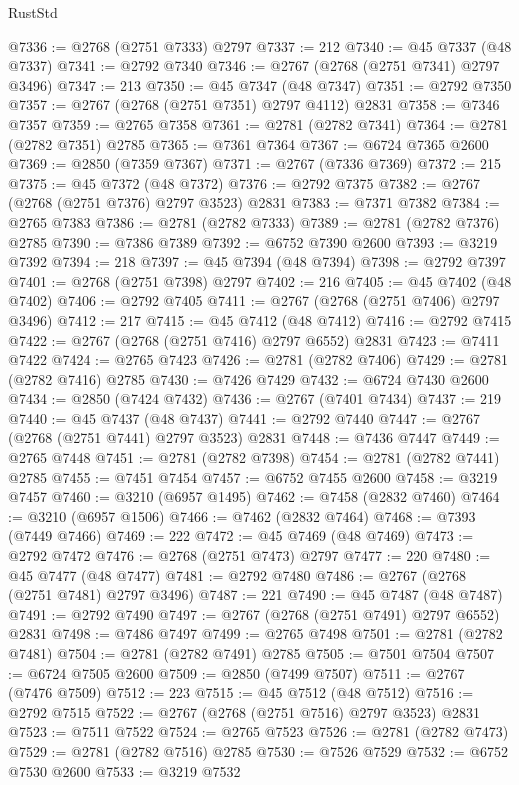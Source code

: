 \begin{lexlean}{RustStd}
\begin{coremodule}
@7336 := @2768 (@2751 @7333) @2797
@7337 := 212
@7340 := @45 @7337 (@48 @7337)
@7341 := @2792 @7340
@7346 := @2767 (@2768 (@2751 @7341) @2797 @3496)
@7347 := 213
@7350 := @45 @7347 (@48 @7347)
@7351 := @2792 @7350
@7357 := @2767 (@2768 (@2751 @7351) @2797 @4112) @2831
@7358 := @7346 @7357
@7359 := @2765 @7358
@7361 := @2781 (@2782 @7341)
@7364 := @2781 (@2782 @7351) @2785
@7365 := @7361 @7364
@7367 := @6724 @7365 @2600
@7369 := @2850 (@7359 @7367)
@7371 := @2767 (@7336 @7369)
@7372 := 215
@7375 := @45 @7372 (@48 @7372)
@7376 := @2792 @7375
@7382 := @2767 (@2768 (@2751 @7376) @2797 @3523) @2831
@7383 := @7371 @7382
@7384 := @2765 @7383
@7386 := @2781 (@2782 @7333)
@7389 := @2781 (@2782 @7376) @2785
@7390 := @7386 @7389
@7392 := @6752 @7390 @2600
@7393 := @3219 @7392
@7394 := 218
@7397 := @45 @7394 (@48 @7394)
@7398 := @2792 @7397
@7401 := @2768 (@2751 @7398) @2797
@7402 := 216
@7405 := @45 @7402 (@48 @7402)
@7406 := @2792 @7405
@7411 := @2767 (@2768 (@2751 @7406) @2797 @3496)
@7412 := 217
@7415 := @45 @7412 (@48 @7412)
@7416 := @2792 @7415
@7422 := @2767 (@2768 (@2751 @7416) @2797 @6552) @2831
@7423 := @7411 @7422
@7424 := @2765 @7423
@7426 := @2781 (@2782 @7406)
@7429 := @2781 (@2782 @7416) @2785
@7430 := @7426 @7429
@7432 := @6724 @7430 @2600
@7434 := @2850 (@7424 @7432)
@7436 := @2767 (@7401 @7434)
@7437 := 219
@7440 := @45 @7437 (@48 @7437)
@7441 := @2792 @7440
@7447 := @2767 (@2768 (@2751 @7441) @2797 @3523) @2831
@7448 := @7436 @7447
@7449 := @2765 @7448
@7451 := @2781 (@2782 @7398)
@7454 := @2781 (@2782 @7441) @2785
@7455 := @7451 @7454
@7457 := @6752 @7455 @2600
@7458 := @3219 @7457
@7460 := @3210 (@6957 @1495)
@7462 := @7458 (@2832 @7460)
@7464 := @3210 (@6957 @1506)
@7466 := @7462 (@2832 @7464)
@7468 := @7393 (@7449 @7466)
@7469 := 222
@7472 := @45 @7469 (@48 @7469)
@7473 := @2792 @7472
@7476 := @2768 (@2751 @7473) @2797
@7477 := 220
@7480 := @45 @7477 (@48 @7477)
@7481 := @2792 @7480
@7486 := @2767 (@2768 (@2751 @7481) @2797 @3496)
@7487 := 221
@7490 := @45 @7487 (@48 @7487)
@7491 := @2792 @7490
@7497 := @2767 (@2768 (@2751 @7491) @2797 @6552) @2831
@7498 := @7486 @7497
@7499 := @2765 @7498
@7501 := @2781 (@2782 @7481)
@7504 := @2781 (@2782 @7491) @2785
@7505 := @7501 @7504
@7507 := @6724 @7505 @2600
@7509 := @2850 (@7499 @7507)
@7511 := @2767 (@7476 @7509)
@7512 := 223
@7515 := @45 @7512 (@48 @7512)
@7516 := @2792 @7515
@7522 := @2767 (@2768 (@2751 @7516) @2797 @3523) @2831
@7523 := @7511 @7522
@7524 := @2765 @7523
@7526 := @2781 (@2782 @7473)
@7529 := @2781 (@2782 @7516) @2785
@7530 := @7526 @7529
@7532 := @6752 @7530 @2600
@7533 := @3219 @7532

\end{coremodule}
\end{lexlean}
